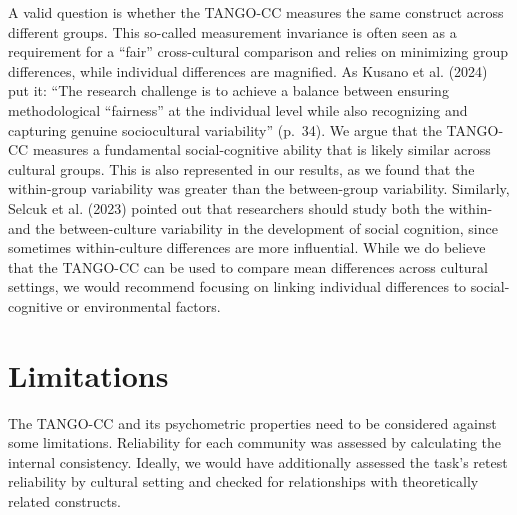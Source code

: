 \documentclass[
  man,mask,floatsintext]{apa7}
\begin{document}
A valid question is whether the TANGO-CC measures the same construct across different groups. This so-called measurement invariance is often seen as a requirement for a ``fair'' cross-cultural comparison and relies on minimizing group differences, while individual differences are magnified. As Kusano et al. (2024) put it: ``The research challenge is to achieve a balance between ensuring methodological ``fairness'' at the individual level while also recognizing and capturing genuine sociocultural variability'' (p.~34). We argue that the TANGO-CC measures a fundamental social-cognitive ability that is likely similar across cultural groups. This is also represented in our results, as we found that the within-group variability was greater than the between-group variability. Similarly, Selcuk et al. (2023) pointed out that researchers should study both the within- and the between-culture variability in the development of social cognition, since sometimes within-culture differences are more influential. While we do believe that the TANGO-CC can be used to compare mean differences across cultural settings, we would recommend focusing on linking individual differences to social-cognitive or environmental factors.

\hypertarget{limitations}{%
\section{Limitations}\label{limitations}}

The TANGO-CC and its psychometric properties need to be considered against some limitations. Reliability for each community was assessed by calculating the internal consistency. Ideally, we would have additionally assessed the task's retest reliability by cultural setting and checked for relationships with theoretically related constructs.
\end{document}
